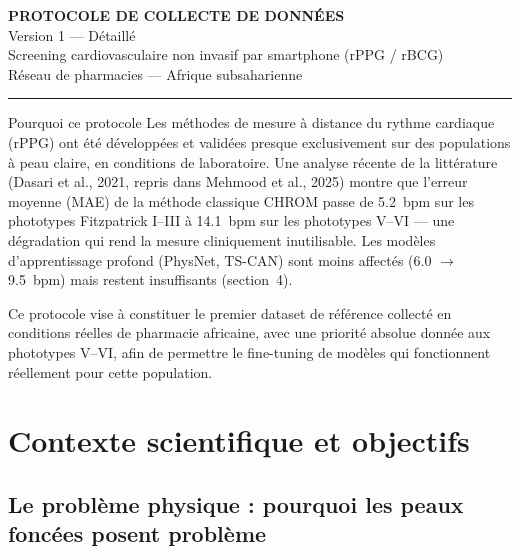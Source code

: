 \documentclass[11pt,a4paper]{article}
\begin{document}
\begin{center}
{\LARGE\bfseries PROTOCOLE DE COLLECTE DE DONN\'EES}\\[8pt]
{\Large Version 1 --- D\'etaill\'e}\\[6pt]
{\large Screening cardiovasculaire non invasif par smartphone (rPPG / rBCG)}\\[4pt]
{\normalsize R\'eseau de pharmacies --- Afrique subsaharienne}
\end{center}

\vspace{0.6cm}
\noindent\rule{\textwidth}{0.6pt}
\vspace{0.3cm}

\begin{notebox}{Pourquoi ce protocole}
Les m\'ethodes de mesure \`a distance du rythme cardiaque (rPPG) ont \'et\'e
d\'evelopp\'ees et valid\'ees presque exclusivement sur des populations \`a
peau claire, en conditions de laboratoire. Une analyse r\'ecente de la
litt\'erature (Dasari et al., 2021, repris dans Mehmood et al., 2025) montre
que l'erreur moyenne (MAE) de la m\'ethode classique CHROM passe de
5.2~bpm sur les phototypes Fitzpatrick I--III \`a 14.1~bpm sur les
phototypes V--VI --- une d\'egradation qui rend la mesure cliniquement
inutilisable. Les mod\`eles d'apprentissage profond (PhysNet, TS-CAN) sont
moins affect\'es (6.0 $\rightarrow$ 9.5~bpm) mais restent insuffisants
(section~4).

Ce protocole vise \`a constituer le premier dataset de r\'ef\'erence collect\'e
en conditions r\'eelles de pharmacie africaine, avec une priorit\'e absolue
donn\'ee aux phototypes V--VI, afin de permettre le fine-tuning de mod\`eles
qui fonctionnent r\'eellement pour cette population.
\end{notebox}

\vspace{0.3cm}
\tableofcontents
\newpage
\section{Contexte scientifique et objectifs}

\subsection{Le probl\`eme physique : pourquoi les peaux fonc\'ees posent
probl\`eme}
\end{document}
